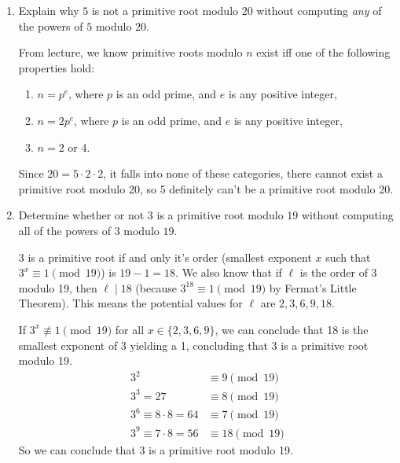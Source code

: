 \documentclass[11pt]{article}
\begin{document}
\begin{enumerate}
\item Explain why $5$ is not a primitive root modulo $20$ without computing \emph{any} of the powers of $5$ modulo $20$. 

  From lecture, we know primitive roots modulo \(n\) exist iff one of the following properties hold:
  \begin{enumerate}[label=(\arabic*)]
    \item \(n = p^e\), where \(p\) is an odd prime, and \(e\) is any positive integer,
    \item \(n = 2p^e\), where \(p\) is an odd prime, and \(e\) is any positive integer,
    \item \(n = 2\) or 4.
  \end{enumerate}

  Since \(20 = 5 \cdot 2 \cdot 2\), it falls into none of these categories, there cannot exist a primitive root modulo 20, so 5 definitely can't be a primitive root modulo 20.

\item Determine whether or not $3$ is a primitive root modulo $19$ without computing all of the powers of $3$ modulo $19$. 

  3 is a primitive root if and only it's order (smallest exponent \(x\) such that \(3^x \equiv 1 \pmod{19}\)) is \(19-1 = 18\).  We also know that if \(\ell\) is the order of 3 modulo 19, then \(\ell \mid 18\) (because \(3^{18} \equiv 1 \pmod{19}\) by Fermat's Little Theorem).  This means the potential values for \(\ell\) are \(2,3,6,9,18\). 

  If \(3^x \not\equiv 1 \pmod{19}\) for all \(x \in \{2,3,6,9\}\), we can conclude that 18 is the smallest exponent of 3 yielding a 1, concluding that 3 is a primitive root modulo 19.
  \begin{align*}
    3^2 &\equiv 9 \pmod{19} \\
    3^3 = 27 &\equiv 8 \pmod{19} \\
    3^6 \equiv 8 \cdot 8 = 64 &\equiv 7 \pmod{19} \\
    3^9 \equiv 7 \cdot 8 = 56 &\equiv 18 \pmod{19}
  \end{align*}
  So we can conclude that 3 is a primitive root modulo 19.
\end{enumerate}
\end{document}
